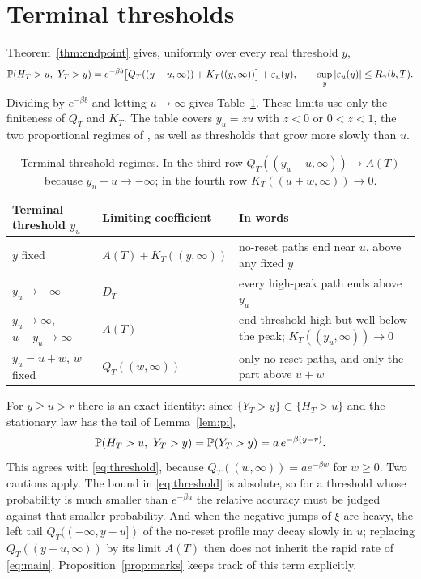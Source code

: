 \documentclass[11pt,a4paper]{article}
\begin{document}
\section{Terminal thresholds}\label{sec:thresholds}

Theorem~\ref{thm:endpoint} gives, uniformly over every real threshold $y$,
\begin{equation}\label{eq:threshold}
 \mathbb P(H_T>u,\ Y_T>y)=e^{-\beta b}\big[Q_T((y-u,\infty))+K_T((y,\infty))\big]+\varepsilon_u(y),\qquad\sup_y|\varepsilon_u(y)|\le R_\gamma(b,T).
\end{equation}
Dividing by $e^{-\beta b}$ and letting $u\to\infty$ gives Table~\ref{tab:regimes}. These limits use only the finiteness of $Q_T$ and $K_T$. The table covers $y_u=zu$ with $z<0$ or $0<z<1$, the two proportional regimes of \cite[Theorem~6]{DHM2026}, as well as thresholds that grow more slowly than $u$.

\begin{table}[h]
\centering\small
\begin{tabular}{@{}llp{6.3cm}@{}}
\toprule
Terminal threshold $y_u$ & Limiting coefficient & In words\\
\midrule
$y$ fixed & $A(T)+K_T((y,\infty))$ & no-reset paths end near $u$, above any fixed $y$\\
$y_u\to-\infty$ & $D_T$ & every high-peak path ends above $y_u$\\
$y_u\to\infty$, $u-y_u\to\infty$ & $A(T)$ & end threshold high but well below the peak; $K_T((y_u,\infty))\to0$\\
$y_u=u+w$, $w$ fixed & $Q_T((w,\infty))$ & only no-reset paths, and only the part above $u+w$\\
\bottomrule
\end{tabular}
\caption{Terminal-threshold regimes. In the third row $Q_T((y_u-u,\infty))\to A(T)$ because $y_u-u\to-\infty$; in the fourth row $K_T((u+w,\infty))\to0$.}
\label{tab:regimes}
\end{table}

For $y\ge u>r$ there is an exact identity: since $\{Y_T>y\}\subset\{H_T>u\}$ and the stationary law has the tail of Lemma~\ref{lem:pi},
\begin{equation}\label{eq:exact}
 \mathbb P(H_T>u,\ Y_T>y)=\mathbb P(Y_T>y)=a\,e^{-\beta(y-r)}.
\end{equation}
This agrees with \eqref{eq:threshold}, because $Q_T((w,\infty))=ae^{-\beta w}$ for $w\ge0$. Two cautions apply. The bound in \eqref{eq:threshold} is absolute, so for a threshold whose probability is much smaller than $e^{-\beta u}$ the relative accuracy must be judged against that smaller probability. And when the negative jumps of $\xi$ are heavy, the left tail $Q_T((-\infty,y-u])$ of the no-reset profile may decay slowly in $u$; replacing $Q_T((y-u,\infty))$ by its limit $A(T)$ then does not inherit the rapid rate of \eqref{eq:main}. Proposition~\ref{prop:marks} keeps track of this term explicitly.
\end{document}
